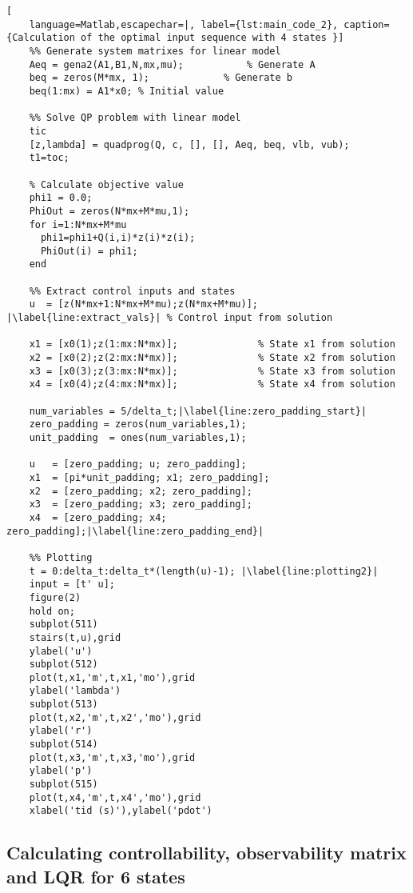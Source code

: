 \begin{lstlisting}[
    language=Matlab,escapechar=|, label={lst:main_code_2}, caption={Calculation of the optimal input sequence with 4 states }]
    %% Generate system matrixes for linear model
    Aeq = gena2(A1,B1,N,mx,mu);           % Generate A
    beq = zeros(M*mx, 1);        	  % Generate b
    beq(1:mx) = A1*x0; % Initial value
    
    %% Solve QP problem with linear model
    tic
    [z,lambda] = quadprog(Q, c, [], [], Aeq, beq, vlb, vub); 
    t1=toc;
    
    % Calculate objective value
    phi1 = 0.0;
    PhiOut = zeros(N*mx+M*mu,1);
    for i=1:N*mx+M*mu
      phi1=phi1+Q(i,i)*z(i)*z(i);
      PhiOut(i) = phi1;
    end
    
    %% Extract control inputs and states
    u  = [z(N*mx+1:N*mx+M*mu);z(N*mx+M*mu)]; |\label{line:extract_vals}| % Control input from solution 
    
    x1 = [x0(1);z(1:mx:N*mx)];              % State x1 from solution
    x2 = [x0(2);z(2:mx:N*mx)];              % State x2 from solution
    x3 = [x0(3);z(3:mx:N*mx)];              % State x3 from solution
    x4 = [x0(4);z(4:mx:N*mx)];              % State x4 from solution
    
    num_variables = 5/delta_t;|\label{line:zero_padding_start}|
    zero_padding = zeros(num_variables,1);
    unit_padding  = ones(num_variables,1);
    
    u   = [zero_padding; u; zero_padding]; 
    x1  = [pi*unit_padding; x1; zero_padding];
    x2  = [zero_padding; x2; zero_padding];
    x3  = [zero_padding; x3; zero_padding];
    x4  = [zero_padding; x4; zero_padding];|\label{line:zero_padding_end}|
    
    %% Plotting
    t = 0:delta_t:delta_t*(length(u)-1); |\label{line:plotting2}|
    input = [t' u]; 
    figure(2)
    hold on;
    subplot(511)
    stairs(t,u),grid
    ylabel('u')
    subplot(512)
    plot(t,x1,'m',t,x1,'mo'),grid
    ylabel('lambda')
    subplot(513)
    plot(t,x2,'m',t,x2','mo'),grid
    ylabel('r')
    subplot(514)
    plot(t,x3,'m',t,x3,'mo'),grid
    ylabel('p')
    subplot(515)
    plot(t,x4,'m',t,x4','mo'),grid
    xlabel('tid (s)'),ylabel('pdot')
\end{lstlisting}

\newpage


\subsection{Calculating controllability, observability matrix and LQR for 6 states }\label{sec:matlab_4_2}

